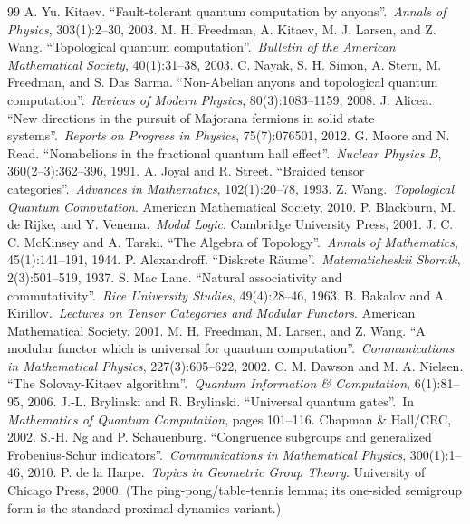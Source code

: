 \begin{thebibliography}{99}
 A. Yu. Kitaev. ``Fault-tolerant quantum computation by anyons''.\ \textit{Annals of Physics}, 303(1):2--30, 2003.
 M. H. Freedman, A. Kitaev, M. J. Larsen, and Z. Wang. ``Topological quantum computation''.\ \textit{Bulletin of the American Mathematical Society}, 40(1):31--38, 2003.
 C. Nayak, S. H. Simon, A. Stern, M. Freedman, and S. Das Sarma. ``Non-Abelian anyons and topological quantum computation''.\ \textit{Reviews of Modern Physics}, 80(3):1083--1159, 2008.
 J. Alicea. ``New directions in the pursuit of Majorana fermions in solid state systems''.\ \textit{Reports on Progress in Physics}, 75(7):076501, 2012.
 G. Moore and N. Read. ``Nonabelions in the fractional quantum hall effect''.\ \textit{Nuclear Physics B}, 360(2--3):362--396, 1991.
 A. Joyal and R. Street. ``Braided tensor categories''.\ \textit{Advances in Mathematics}, 102(1):20--78, 1993.
 Z. Wang.\ \textit{Topological Quantum Computation}. American Mathematical Society, 2010.
 P. Blackburn, M. de Rijke, and Y. Venema.\ \textit{Modal Logic}. Cambridge University Press, 2001.
 J. C. C. McKinsey and A. Tarski. ``The Algebra of Topology''.\ \textit{Annals of Mathematics}, 45(1):141--191, 1944.
 P. Alexandroff. ``Diskrete Räume''.\ \textit{Matematicheskii Sbornik}, 2(3):501--519, 1937.
 S. Mac Lane. ``Natural associativity and commutativity''.\ \textit{Rice University Studies}, 49(4):28--46, 1963.
 B. Bakalov and A. Kirillov.\ \textit{Lectures on Tensor Categories and Modular Functors}. American Mathematical Society, 2001.
 M. H. Freedman, M. Larsen, and Z. Wang. ``A modular functor which is universal for quantum computation''.\ \textit{Communications in Mathematical Physics}, 227(3):605--622, 2002.
 C. M. Dawson and M. A. Nielsen. ``The Solovay-Kitaev algorithm''.\ \textit{Quantum Information \& Computation}, 6(1):81--95, 2006.
 J.-L. Brylinski and R. Brylinski. ``Universal quantum gates''.\ In \textit{Mathematics of Quantum Computation}, pages 101--116. Chapman \& Hall/CRC, 2002.
 S.-H. Ng and P. Schauenburg. ``Congruence subgroups and generalized Frobenius-Schur indicators''.\ \textit{Communications in Mathematical Physics}, 300(1):1--46, 2010.
 P. de la Harpe.\ \textit{Topics in Geometric Group Theory}. University of Chicago Press, 2000. (The ping-pong/table-tennis lemma; its one-sided semigroup form is the standard proximal-dynamics variant.)

\end{thebibliography}
